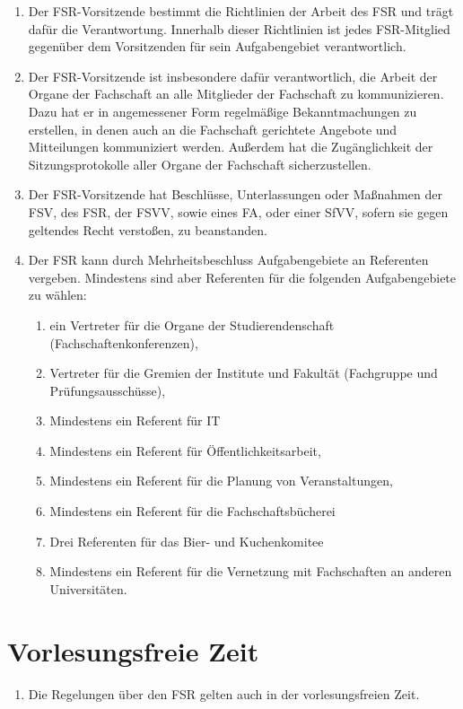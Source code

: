 \documentclass{article}
\begin{document}
\begin{enumerate}[(1)]
	\item Der FSR-Vorsitzende bestimmt die Richtlinien der Arbeit des FSR und trägt dafür die Verantwortung. Innerhalb dieser Richtlinien ist jedes FSR-Mitglied gegenüber dem Vorsitzenden für sein Aufgabengebiet verantwortlich.
	\item Der FSR-Vorsitzende ist insbesondere dafür verantwortlich, die Arbeit der Organe der Fachschaft an alle Mitglieder der Fachschaft zu kommunizieren. Dazu hat er in angemessener Form regelmäßige Bekanntmachungen zu erstellen, in denen auch an die Fachschaft gerichtete Angebote und Mitteilungen kommuniziert werden. Außerdem hat die Zugänglichkeit der Sitzungsprotokolle aller Organe der Fachschaft sicherzustellen.
	\item Der FSR-Vorsitzende hat Beschlüsse, Unterlassungen oder Maßnahmen der FSV, des FSR, der FSVV, sowie eines FA, oder einer SfVV, sofern sie gegen geltendes Recht verstoßen, zu beanstanden.
	\item Der FSR kann durch Mehrheitsbeschluss Aufgabengebiete an Referenten vergeben. Mindestens sind aber Referenten für die folgenden Aufgabengebiete zu wählen:
	\begin{enumerate}[1.]
		\item ein Vertreter für die Organe der Studierendenschaft (Fachschaftenkonferenzen),
		\item Vertreter für die Gremien der Institute und Fakultät (Fachgruppe und Prüfungsausschüsse),
		\item Mindestens ein Referent für IT
		\item Mindestens ein Referent für Öffentlichkeitsarbeit,
		\item Mindestens ein Referent für die Planung von Veranstaltungen,
		\item Mindestens ein Referent für die Fachschaftsbücherei
		\item Drei Referenten für das Bier- und Kuchenkomitee
		\item Mindestens ein Referent für die Vernetzung mit Fachschaften an anderen Universitäten.
	\end{enumerate}
\end{enumerate}

\section{Vorlesungsfreie Zeit}\label{vorlesungsfreie-zeit-1}

\begin{enumerate}[(1)]
	\item Die Regelungen über den FSR gelten auch in der vorlesungsfreien Zeit.
\end{enumerate}
\end{document}
